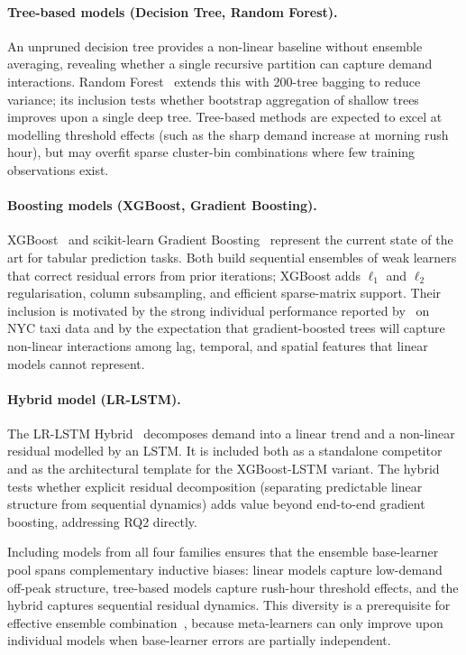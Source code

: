 \paragraph{Tree-based models (Decision Tree, Random Forest).} An unpruned decision tree provides a non-linear baseline without ensemble averaging, revealing whether a single recursive partition can capture demand interactions. Random Forest~\parencite{breiman2001rf} extends this with 200-tree bagging to reduce variance; its inclusion tests whether bootstrap aggregation of shallow trees improves upon a single deep tree. Tree-based methods are expected to excel at modelling threshold effects (such as the sharp demand increase at morning rush hour), but may overfit sparse cluster-bin combinations where few training observations exist.

\paragraph{Boosting models (XGBoost, Gradient Boosting).} XGBoost~\parencite{chen2016xgboost} and scikit-learn Gradient Boosting~\parencite{friedman2001gbm} represent the current state of the art for tabular prediction tasks. Both build sequential ensembles of weak learners that correct residual errors from prior iterations; XGBoost adds $\ell_1$ and $\ell_2$ regularisation, column subsampling, and efficient sparse-matrix support. Their inclusion is motivated by the strong individual performance reported by~\parencite{liu2021epidemic} on NYC taxi data and by the expectation that gradient-boosted trees will capture non-linear interactions among lag, temporal, and spatial features that linear models cannot represent.

\paragraph{Hybrid model (LR-LSTM).} The LR-LSTM Hybrid~\parencite{kim2020hybrid,hochreiter1997long} decomposes demand into a linear trend and a non-linear residual modelled by an LSTM. It is included both as a standalone competitor and as the architectural template for the XGBoost-LSTM variant. The hybrid tests whether explicit residual decomposition (separating predictable linear structure from sequential dynamics) adds value beyond end-to-end gradient boosting, addressing RQ2 directly.

Including models from all four families ensures that the ensemble base-learner pool spans complementary inductive biases: linear models capture low-demand off-peak structure, tree-based models capture rush-hour threshold effects, and the hybrid captures sequential residual dynamics. This diversity is a prerequisite for effective ensemble combination~\parencite{wolpert1992stacking}, because meta-learners can only improve upon individual models when base-learner errors are partially independent.

